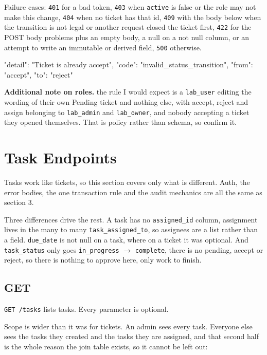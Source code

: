 \documentclass[12pt,letterpaper]{article}
\newenvironment{note}[1][Additional note]
  {\begin{notebox}\noindent\textbf{#1.}\space\ignorespaces}
  {\end{notebox}}
\begin{document}
Failure cases: \texttt{401} for a bad token, \texttt{403} when \texttt{active}
is false or the role may not make this change, \texttt{404} when no ticket has
that id, \texttt{409} with the body below when the transition is not legal or
another request closed the ticket first, \texttt{422} for the POST body problems
plus an empty body, a null on a not null column, or an attempt to write an
immutable or derived field, \texttt{500} otherwise.

\begin{code}
{
  "detail": "Ticket is already accept",
  "code": "invalid_status_transition",
  "from": "accept",
  "to": "reject"
}
\end{code}

\begin{note}[Additional note on roles]
the rule I would expect is a \texttt{lab\_user} editing the wording of their own
Pending ticket and nothing else, with accept, reject and assign belonging to
\texttt{lab\_admin} and \texttt{lab\_owner}, and nobody accepting a ticket they
opened themselves. That is policy rather than schema, so confirm it.
\end{note}

\section{Task Endpoints}

Tasks work like tickets, so this section covers only what is different. Auth,
the error bodies, the one transaction rule and the audit mechanics are all the
same as section 3.

Three differences drive the rest. A task has no \texttt{assigned\_id} column,
assignment lives in the many to many \texttt{task\_assigned\_to}, so assignees
are a list rather than a field. \texttt{due\_date} is not null on a task, where
on a ticket it was optional. And \texttt{task\_status} only goes
\texttt{in\_progress} $\to$ \texttt{complete}, there is no pending, accept or
reject, so there is nothing to approve here, only work to finish.

\subsection{GET}

\texttt{GET /tasks} lists tasks. Every parameter is optional.

Scope is wider than it was for tickets. An admin sees every task. Everyone else
sees the tasks they created and the tasks they are assigned, and that second
half is the whole reason the join table exists, so it cannot be left out:
\end{document}
